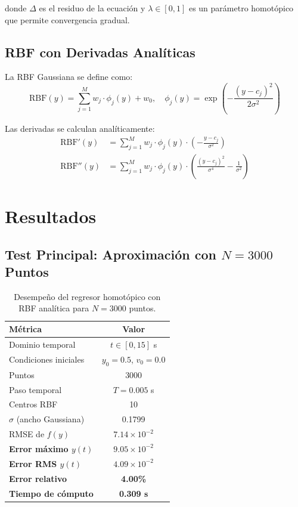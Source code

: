 \documentclass[11pt,a4paper]{article}
\begin{document}
donde $\Delta$ es el residuo de la ecuación y $\lambda \in [0,1]$ es un parámetro homotópico que permite convergencia gradual.

\subsection{RBF con Derivadas Analíticas}

La RBF Gaussiana se define como:
\begin{equation}
\text{RBF}(y) = \sum_{j=1}^M w_j \cdot \phi_j(y) + w_0, \quad \phi_j(y) = \exp\left(-\frac{(y - c_j)^2}{2\sigma^2}\right)
\end{equation}

Las derivadas se calculan analíticamente:
\begin{align}
\text{RBF}'(y) &= \sum_{j=1}^M w_j \cdot \phi_j(y) \cdot \left(-\frac{y - c_j}{\sigma^2}\right) \\
\text{RBF}''(y) &= \sum_{j=1}^M w_j \cdot \phi_j(y) \cdot \left(\frac{(y - c_j)^2}{\sigma^4} - \frac{1}{\sigma^2}\right)
\end{align}

\section{Resultados}

\subsection{Test Principal: Aproximación con $N=3000$ Puntos}

\begin{table}[H]
\centering
\begin{tabular}{lc}
\toprule
\textbf{Métrica} & \textbf{Valor} \\
\midrule
Dominio temporal & $t \in [0, 15]$ s \\
Condiciones iniciales & $y_0 = 0.5$, $v_0 = 0.0$ \\
Puntos & 3000 \\
Paso temporal & $T = 0.005$ s \\
\midrule
\rowcolor{green!10}
Centros RBF & 10 \\
\rowcolor{green!10}
$\sigma$ (ancho Gaussiana) & 0.1799 \\
\rowcolor{green!10}
RMSE de $f(y)$ & $7.14 \times 10^{-2}$ \\
\midrule
\rowcolor{blue!10}
\textbf{Error máximo $y(t)$} & \textbf{$9.05 \times 10^{-2}$} \\
\rowcolor{blue!10}
\textbf{Error RMS $y(t)$} & \textbf{$4.09 \times 10^{-2}$} \\
\rowcolor{blue!10}
\textbf{Error relativo} & \textbf{4.00\%} \\
\rowcolor{blue!10}
\textbf{Tiempo de cómputo} & \textbf{0.309 s} \\
\bottomrule
\end{tabular}
\caption{Desempeño del regresor homotópico con RBF analítica para $N=3000$ puntos.}
\end{table}
\end{document}
